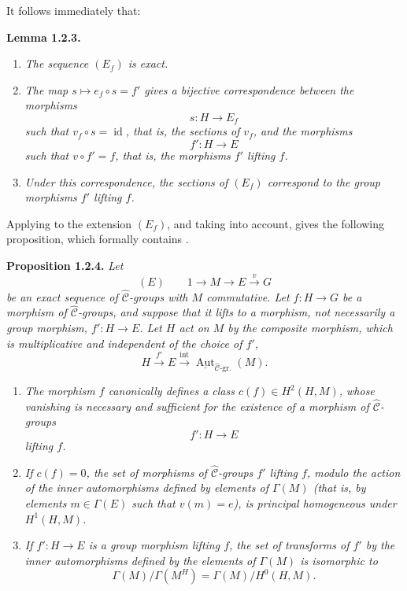 It follows immediately that:

\medskip
\noindent{}\textbf{Lemma 1.2.3.}
\begin{enumerate}
 \item[(i)] \textit{The sequence \((E_f)\) is exact.}

 \item[(ii)] \textit{The map \(s\mapsto e_f\circ s=f'\) gives a
 bijective correspondence between the morphisms}
 \[
  s:H\longrightarrow E_f
 \]
 \textit{such that \(v_f\circ s=\operatorname{id}\), that is, the
 sections of \(v_f\), and the morphisms}
 \[
  f':H\longrightarrow E
 \]
 \textit{such that \(v\circ f'=f\), that is, the morphisms \(f'\)
 lifting \(f\).}

 \item[(iii)] \textit{Under this correspondence, the sections of
 \((E_f)\) correspond to the group morphisms \(f'\) lifting \(f\).}
\end{enumerate}

Applying  to the extension \((E_f)\), and taking 
into account, gives the following proposition, which formally contains
.

\medskip
\noindent{}\textbf{Proposition 1.2.4.}
\textit{Let}
\[
 (E)\qquad 1\longrightarrow M\longrightarrow E\xrightarrow{v}G
\]
\textit{be an exact sequence of \(\widehat{\mathscr C}\)-groups with
\(M\) commutative. Let \(f:H\to G\) be a morphism of
\(\widehat{\mathscr C}\)-groups, and suppose that it lifts to a
morphism, not necessarily a group morphism, \(f':H\to E\). Let \(H\)
act on \(M\) by the composite morphism, which is multiplicative and
independent of the choice of \(f'\),}
\[
 H\xrightarrow{f'}E\xrightarrow{\operatorname{int}}
 \underline{\operatorname{Aut}}_{\widehat{\mathscr C}\text{-gr.}}(M).
\]
\begin{enumerate}
 \item[(i)] \textit{The morphism \(f\) canonically defines a class
 \(c(f)\in H^2(H,M)\), whose vanishing is necessary and sufficient for
 the existence of a morphism of \(\widehat{\mathscr C}\)-groups}
 \[
  f':H\longrightarrow E
 \]
 \textit{lifting \(f\).}

 \item[(ii)] \textit{If \(c(f)=0\), the set of morphisms of
 \(\widehat{\mathscr C}\)-groups \(f'\) lifting \(f\), modulo the
 action of the inner automorphisms defined by elements of \(\Gamma(M)\)
 (that is, by elements \(m\in\Gamma(E)\) such that \(v(m)=e\)), is
 principal homogeneous under \(H^1(H,M)\).}

 \item[\SGAInlineRefTarget{sga3:iii:proposition:1-2-4:item:iii}(iii)] \textit{If \(f':H\to E\) is a group morphism lifting
 \(f\), the set of transforms of \(f'\) by the inner automorphisms
 defined by the elements of \(\Gamma(M)\) is isomorphic to}
 \[
  \Gamma(M)/\Gamma(M^H)=\Gamma(M)/H^0(H,M).
 \]
\end{enumerate}

